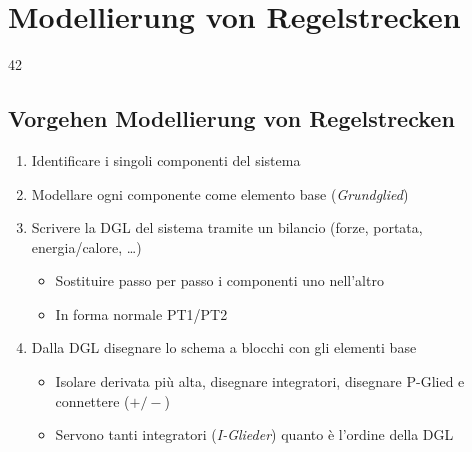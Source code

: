 \section{Modellierung von Regelstrecken}{42}

\subsection{Vorgehen Modellierung von Regelstrecken}

\begin{enumerate}
  \item Identificare i singoli componenti del sistema
  \item Modellare ogni componente come elemento base (\textit{Grundglied})
  \item Scrivere la DGL del sistema tramite un bilancio (forze, portata, energia/calore, \dots)
  \begin{itemize}
    \item Sostituire passo per passo i componenti uno nell'altro
    \item In forma normale PT1/PT2 
  \end{itemize}
  \item Dalla DGL disegnare lo schema a blocchi con gli elementi base
  \begin{itemize}
    \item Isolare derivata più alta, disegnare integratori, disegnare P-Glied e connettere ($+ / -$)
    \item Servono tanti integratori (\textit{I-Glieder}) quanto è l'ordine della DGL
  \end{itemize}
\end{enumerate}



